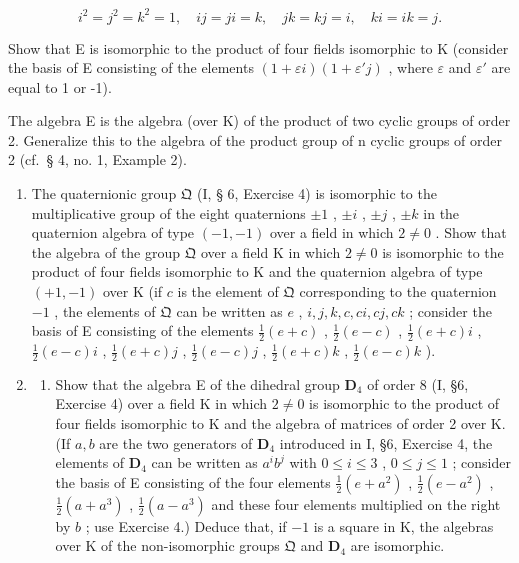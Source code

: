 \[
i ^ {2} = j ^ {2} = k ^ {2} = 1, \quad i j = j i = k, \quad j k = k j = i, \quad k i = i k = j.
\]

Show that E is isomorphic to the product of four fields isomorphic to K (consider the basis of E consisting of the elements \((1 + \varepsilon i)(1 + \varepsilon'j)\) , where \(\varepsilon\) and \(\varepsilon'\) are equal to 1 or -1).

The algebra E is the algebra (over K) of the product of two cyclic groups of order 2. Generalize this to the algebra of the product group of n cyclic groups of order 2 (cf.~§ 4, no. 1, Example 2).

\begin{enumerate}
\def\labelenumi{\arabic{enumi}.}
\setcounter{enumi}{7}
\item
  The quaternionic group \(\mathfrak{Q}\) (I, § 6, Exercise 4) is isomorphic to the multiplicative group of the eight quaternions \(\pm 1\) , \(\pm i\) , \(\pm j\) , \(\pm k\) in the quaternion algebra of type \((-1, -1)\) over a field in which \(2 \neq 0\) . Show that the algebra of the group \(\mathfrak{Q}\) over a field K in which \(2 \neq 0\) is isomorphic to the product of four fields isomorphic to K and the quaternion algebra of type \((+1, -1)\) over K (if \(c\) is the element of \(\mathfrak{Q}\) corresponding to the quaternion \(-1\) , the elements of \(\mathfrak{Q}\) can be written as \(e\) , \(i, j, k, c, ci, cj, ck\) ; consider the basis of E consisting of the elements \(\frac{1}{2}(e + c)\) , \(\frac{1}{2}(e - c)\) , \(\frac{1}{2}(e + c)i\) , \(\frac{1}{2}(e - c)i\) , \(\frac{1}{2}(e + c)j\) , \(\frac{1}{2}(e - c)j\) , \(\frac{1}{2}(e + c)k\) , \(\frac{1}{2}(e - c)k\) ).
\item
  \begin{enumerate}
  \def\labelenumii{(\alph{enumii})}
  \tightlist
  \item
    Show that the algebra E of the dihedral group \(\mathbf{D}_4\) of order 8 (I, §6, Exercise 4) over a field K in which \(2 \neq 0\) is isomorphic to the product of four fields isomorphic to K and the algebra of matrices of order 2 over K. (If \(a, b\) are the two generators of \(\mathbf{D}_4\) introduced in I, §6, Exercise 4, the elements of \(\mathbf{D}_4\) can be written as \(a^i b^j\) with \(0 \leqslant i \leqslant 3\) , \(0 \leqslant j \leqslant 1\) ; consider the basis of E consisting of the four elements \(\frac{1}{2}(e + a^2)\) , \(\frac{1}{2}(e - a^2)\) , \(\frac{1}{2}(a + a^3)\) , \(\frac{1}{2}(a - a^3)\) and these four elements multiplied on the right by \(b\) ; use Exercise 4.) Deduce that, if \(-1\) is a square in K, the algebras over K of the non-isomorphic groups \(\mathfrak{Q}\) and \(\mathbf{D}_4\) are isomorphic.
  \end{enumerate}
\end{enumerate}

